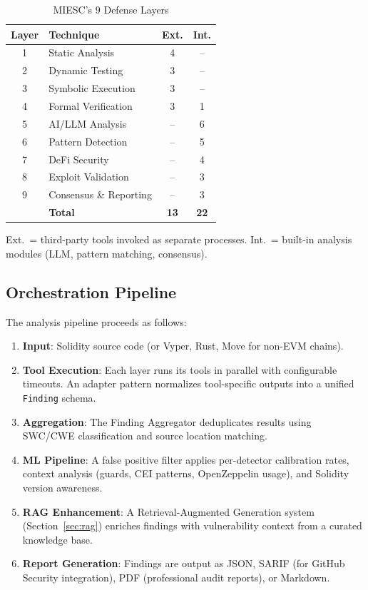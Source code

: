 \documentclass[conference]{IEEEtran}
\begin{document}
\begin{table}[htbp]
\caption{MIESC's 9 Defense Layers}
\label{tab:layers}
\centering
\begin{tabular}{@{}clcc@{}}
\toprule
\textbf{Layer} & \textbf{Technique} & \textbf{Ext.} & \textbf{Int.} \\
\midrule
1 & Static Analysis & 4 & -- \\
2 & Dynamic Testing & 3 & -- \\
3 & Symbolic Execution & 3 & -- \\
4 & Formal Verification & 3 & 1 \\
5 & AI/LLM Analysis & -- & 6 \\
6 & Pattern Detection & -- & 5 \\
7 & DeFi Security & -- & 4 \\
8 & Exploit Validation & -- & 3 \\
9 & Consensus \& Reporting & -- & 3 \\
\midrule
  & \textbf{Total} & \textbf{13} & \textbf{22} \\
\bottomrule
\end{tabular}
\footnotesize{Ext.\ = third-party tools invoked as separate processes. Int.\ = built-in analysis modules (LLM, pattern matching, consensus).}
\end{table}

\subsection{Orchestration Pipeline}

The analysis pipeline proceeds as follows:

\begin{enumerate}
    \item \textbf{Input}: Solidity source code (or Vyper, Rust, Move for non-EVM chains).
    \item \textbf{Tool Execution}: Each layer runs its tools in parallel with configurable timeouts. An adapter pattern normalizes tool-specific outputs into a unified \texttt{Finding} schema.
    \item \textbf{Aggregation}: The Finding Aggregator deduplicates results using SWC/CWE classification and source location matching.
    \item \textbf{ML Pipeline}: A false positive filter applies per-detector calibration rates, context analysis (guards, CEI patterns, OpenZeppelin usage), and Solidity version awareness.
    \item \textbf{RAG Enhancement}: A Retrieval-Augmented Generation system (Section~\ref{sec:rag}) enriches findings with vulnerability context from a curated knowledge base.
    \item \textbf{Report Generation}: Findings are output as JSON, SARIF (for GitHub Security integration), PDF (professional audit reports), or Markdown.
\end{enumerate}
\end{document}
